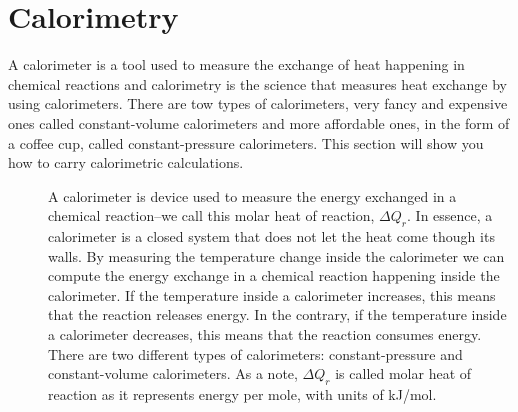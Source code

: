 \documentclass[main.tex]{subfiles}
\begin{document}
\section{Calorimetry}
A calorimeter is a tool used to measure the exchange of heat happening in chemical reactions and calorimetry is the science that measures heat exchange by using calorimeters. There are tow types of calorimeters, very fancy and expensive ones called constant-volume calorimeters and more affordable ones, in the form of a coffee cup, called constant-pressure calorimeters. This section will show you how to carry calorimetric calculations. 
\sloppy
\begin{description}
\item[] 
A calorimeter is device used to measure the energy exchanged in a chemical reaction--we call this molar heat of reaction, $\Delta Q_{r}$. In essence, a calorimeter is a closed system that does not let the heat come though its walls. By measuring the temperature change inside the calorimeter we can compute the energy exchange in a chemical reaction happening inside the calorimeter. If the temperature inside a calorimeter increases, this means that the reaction releases energy. In the contrary, if the temperature inside a calorimeter decreases, this means that the reaction consumes energy. There are two different types of calorimeters: constant-pressure and constant-volume calorimeters. As a note, $\Delta Q_{r}$ is called molar heat of reaction as it represents energy per mole, with units of kJ/mol.


\end{description}
\end{document}
